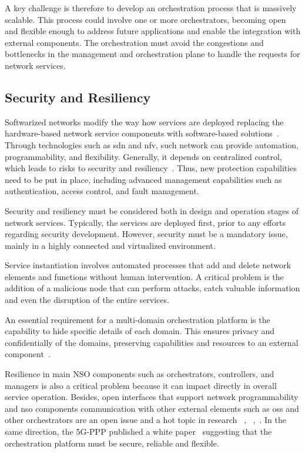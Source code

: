 A key challenge is therefore to develop an orchestration process that is massively scalable. This process could involve one or more orchestrators, becoming open and flexible enough to address future applications and enable the integration with external components. The orchestration must avoid the congestions and bottlenecks in the management and orchestration plane to handle the requests for network services.

\subsection{Security and Resiliency}

Softwarized networks modify the way how services are deployed replacing the hardware-based network service components with software-based solutions~\cite{Draxler2017SONATA:Networksb}. Through technologies such as \gls{sdn} and \gls{nfv}, such network can provide automation, programmability, and flexibility. Generally, it depends on centralized control, which leads to risks to security and resiliency~\cite{Arfaoui2017SecurityDirections}. Thus, new protection capabilities need to be put in place, including advanced management capabilities such as authentication, access control, and fault management. 

Security and resiliency must be considered both in design and operation stages of network services. Typically, the services are deployed first, prior to any efforts regarding security development. However, security must be a mandatory issue, mainly in a highly connected and virtualized environment. 

Service instantiation involves automated processes that add and delete network elements and functions without human intervention. A critical problem is the addition of a malicious node that can perform attacks, catch valuable information and even the disruption of the entire services.      

An essential requirement for a multi-domain orchestration platform is the capability to hide specific details of each domain. This ensures privacy and confidentially of the domains, preserving capabilities and resources to an external component~\cite{francescon2017x}.

Resilience in main NSO components such as orchestrators, controllers, and managers is also a critical problem because it can impact directly in overall service operation. Besides, open interfaces that support network programmability and \gls{nso} components communication with other external elements such as \gls{oss} and other orchestrators are an open issue and a hot topic in research ~\cite{Ordonez-Lucena2017NetworkChallenges}, ~\cite{Arfaoui2017SecurityDirections},~\cite{7345422}. In the same direction, the 5G-PPP published a white paper~\cite{elayoubi:hal-01488208} suggesting that the orchestration platform must be secure, reliable and flexible.

